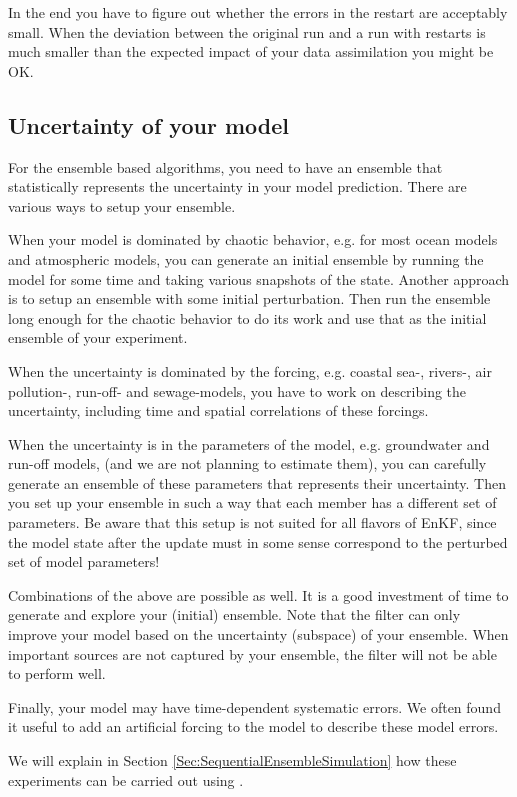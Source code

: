 In the end you have to figure out whether the errors in the restart are acceptably small. When the deviation between the original run and a run with restarts is much smaller than the expected impact of your data assimilation you might be OK.

\subsection{Uncertainty of your model}
For the ensemble based algorithms, you need to have an ensemble that statistically represents the uncertainty in your model prediction. There are various ways to setup your ensemble. 

When your model is dominated by chaotic behavior, e.g. for most ocean models and atmospheric models, you can generate an initial ensemble by running the model for some time and taking various snapshots of the state. Another approach is to setup an ensemble with some initial perturbation. Then run the ensemble long enough for the chaotic behavior to do its work and use that as the initial ensemble of your experiment.

When the uncertainty is dominated by the forcing, e.g. coastal sea-, rivers-, air pollution-, run-off- and sewage-models, you have to work on describing the uncertainty, including time and spatial correlations of these forcings.

When the uncertainty is in the parameters of the model, e.g.  groundwater and run-off models, (and we are not planning to estimate them), you can carefully generate an ensemble of these parameters that represents their uncertainty. Then you set up your ensemble in such a way that each member has a different set of parameters.  Be aware that this setup is not suited for all flavors of EnKF, since the model state after the update must in some sense correspond to the perturbed set of model parameters!

Combinations of the above are possible as well. It is a good investment of time to generate and explore your (initial) ensemble. Note that the filter can only improve your model based on the uncertainty (subspace) of your ensemble. When important sources are not captured by your ensemble, the filter will not be able to perform well. 

Finally, your model may have time-dependent systematic errors. We often found it useful to add an artificial forcing to the model to describe these model errors.

We will explain in Section \ref{Sec:SequentialEnsembleSimulation} how these experiments can be carried out using \oda.



